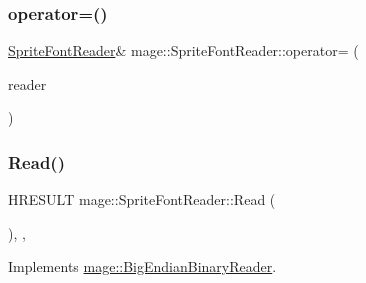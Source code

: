 \hypertarget{classmage_1_1_sprite_font_reader_aae3c6305ea97146bd85b2d93a037d47d}{}\label{classmage_1_1_sprite_font_reader_aae3c6305ea97146bd85b2d93a037d47d} 
\subsubsection{\texorpdfstring{operator=()}{operator=()}\hspace{0.1cm}{\footnotesize\ttfamily [2/2]}}
{\footnotesize\ttfamily \hyperlink{classmage_1_1_sprite_font_reader}{Sprite\+Font\+Reader}\& mage\+::\+Sprite\+Font\+Reader\+::operator= (\begin{DoxyParamCaption}\item[{\hyperlink{classmage_1_1_sprite_font_reader}{Sprite\+Font\+Reader} \&\&}]{reader }\end{DoxyParamCaption})\hspace{0.3cm}{\ttfamily [delete]}}

\hypertarget{classmage_1_1_sprite_font_reader_a6bc9fa71b4c9d884ba939d99f4c9c0d7}{}\label{classmage_1_1_sprite_font_reader_a6bc9fa71b4c9d884ba939d99f4c9c0d7} 
\subsubsection{\texorpdfstring{Read()}{Read()}}
{\footnotesize\ttfamily H\+R\+E\+S\+U\+LT mage\+::\+Sprite\+Font\+Reader\+::\+Read (\begin{DoxyParamCaption}{ }\end{DoxyParamCaption})\hspace{0.3cm}{\ttfamily [override]}, {\ttfamily [private]}, {\ttfamily [virtual]}}



Implements \hyperlink{classmage_1_1_big_endian_binary_reader_a723f28280c4e1343f42f41eea2b97015}{mage\+::\+Big\+Endian\+Binary\+Reader}.

\hypertarget{classmage_1_1_sprite_font_reader_a0ab2521309a82f1160e4839b8ca6e400}{}\label{classmage_1_1_sprite_font_reader_a0ab2521309a82f1160e4839b8ca6e400} 
